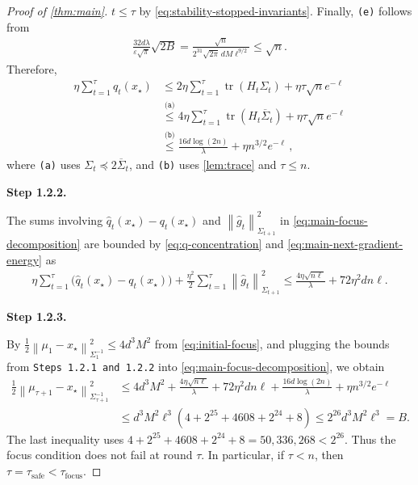 \documentclass[11pt]{article}
\newcommand{\proofstepinline}[1]{%
    {\sffamily\bfseries\color{blue!55!black}Step #1.}\enspace
}
\newcommand{\reason}[1]{\texttt{(#1)}}
\newcommand{\explan}[2]{\stackrel{\reason{#2}}{#1}}
\newcommand{\tr}{\operatorname{tr}}
\newcommand{\1}{\mathbf 1}
\newcommand{\eps}{\varepsilon}
\newcommand{\normm}[2]{\left\lVert #1\right\rVert_{#2}}
\begin{document}
\begin{proof}[Proof of \cref{thm:main}]
    $t\leq\tau$ by \eqref{eq:stability-stopped-invariants}.
    Finally, \reason{e} follows from
    \begin{align}
        \frac{32d\lambda}{\eps\sqrt\pi}\sqrt{2B}
        =
        \frac{\sqrt n}
        {2^{31}\sqrt{2\pi}\,dM\ell^{9/2}}
        \leq\sqrt n.
    \end{align}
    Therefore,
    \begin{align}
        \eta\sum_{t=1}^{\tau}q_t(x_\star)
         & \leq
        2\eta\sum_{t=1}^{\tau}\tr(H_t\Sigma_t)
        +\eta\tau\sqrt{n}e^{-\ell}
        \\
         &
        \explan{\leq}{a}
        4\eta\sum_{t=1}^{\tau}\tr(H_t\overline\Sigma_t)
        +\eta\tau\sqrt{n}e^{-\ell}
        \\
         &
        \explan{\leq}{b}
        \frac{16d\log(2n)}{\lambda}
        +\eta n^{3/2}e^{-\ell}\,,
    \end{align}
    where \reason{a} uses
    $\Sigma_t\preceq2\overline\Sigma_t$, and
    \reason{b} uses \cref{lem:trace} and $\tau\leq n$.

    \proofstepinline{1.2.2}
    The sums involving
    $\widehat q_t(x_\star)-q_t(x_\star)$ and
    $\normm{\widehat g_t}{\Sigma_{t+1}}^2$
    in \eqref{eq:main-focus-decomposition} are bounded by
    \eqref{eq:q-concentration} and
    \eqref{eq:main-next-gradient-energy} as
    \begin{align}
        \eta\sum_{t=1}^{\tau}
        \bigl(\widehat q_t(x_\star)-q_t(x_\star)\bigr)
        +\frac{\eta^2}{2}\sum_{t=1}^{\tau}
        \normm{\widehat g_t}{\Sigma_{t+1}}^2
        \leq
        \frac{4\eta\sqrt{n\ell}}{\lambda}
        +72\eta^2dn\ell.
    \end{align}

    \proofstepinline{1.2.3}
    By
    $\frac12\normm{\mu_1-x_\star}{\Sigma_1^{-1}}^2\leq4d^3M^2$
    from \eqref{eq:initial-focus}, and plugging the bounds from
    \texttt{Steps 1.2.1 and 1.2.2} into
    \eqref{eq:main-focus-decomposition}, we obtain
    \begin{align}
        \frac12
        \normm{\mu_{\tau+1}-x_\star}{\Sigma_{\tau+1}^{-1}}^2
         & \leq
        4d^3M^2
        +\frac{4\eta\sqrt{n\ell}}{\lambda}
        +72\eta^2dn\ell
        +\frac{16d\log(2n)}{\lambda}
        +\eta n^{3/2}e^{-\ell}
        \\
         & \leq
        d^3M^2\ell^3\left(
        4
        +2^{25}
        +4608
        +2^{24}
        +8
        \right)
        \leq
        2^{26}d^3M^2\ell^3
        =B.
    \end{align}
    The last inequality uses
    $4+2^{25}+4608+2^{24}+8=50{,}336{,}268<2^{26}$.
    Thus the focus condition does not fail at round $\tau$.  In particular,
    if $\tau<n$, then
    $\tau=\tau_{\mathrm{safe}}<\tau_{\mathrm{focus}}$.


\end{proof}
\end{document}
